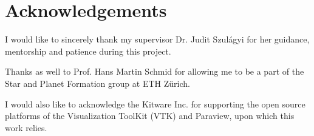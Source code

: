 \documentclass[preprint2]{aastex62}
\newcommand\aastex{AAS\TeX}
\begin{document}
\section{Acknowledgements}
I would like to sincerely thank my supervisor Dr. Judit Szul\'{a}gyi for her guidance, mentorship and patience during this project.

Thanks as well to Prof. Hans Martin Schmid for allowing me to be a part of the Star and Planet Formation group at ETH Z\"{u}rich.

I would also like to acknowledge the Kitware Inc. for supporting the open source platforms of the Visualization ToolKit (VTK)  and Paraview, upon which this work relies.







\end{document}
